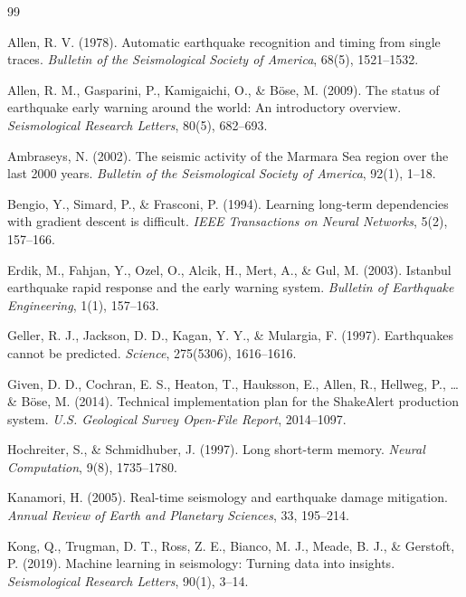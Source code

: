 \begin{thebibliography}{99}

Allen, R. V. (1978). Automatic earthquake recognition and timing from single traces. \textit{Bulletin of the Seismological Society of America}, 68(5), 1521--1532.

Allen, R. M., Gasparini, P., Kamigaichi, O., \& Böse, M. (2009). The status of earthquake early warning around the world: An introductory overview. \textit{Seismological Research Letters}, 80(5), 682--693.

Ambraseys, N. (2002). The seismic activity of the Marmara Sea region over the last 2000 years. \textit{Bulletin of the Seismological Society of America}, 92(1), 1--18.

Bengio, Y., Simard, P., \& Frasconi, P. (1994). Learning long-term dependencies with gradient descent is difficult. \textit{IEEE Transactions on Neural Networks}, 5(2), 157--166.

Erdik, M., Fahjan, Y., Ozel, O., Alcik, H., Mert, A., \& Gul, M. (2003). Istanbul earthquake rapid response and the early warning system. \textit{Bulletin of Earthquake Engineering}, 1(1), 157--163.

Geller, R. J., Jackson, D. D., Kagan, Y. Y., \& Mulargia, F. (1997). Earthquakes cannot be predicted. \textit{Science}, 275(5306), 1616--1616.

Given, D. D., Cochran, E. S., Heaton, T., Hauksson, E., Allen, R., Hellweg, P., \ldots \& Böse, M. (2014). Technical implementation plan for the ShakeAlert production system. \textit{U.S. Geological Survey Open-File Report}, 2014--1097.

Hochreiter, S., \& Schmidhuber, J. (1997). Long short-term memory. \textit{Neural Computation}, 9(8), 1735--1780.

Kanamori, H. (2005). Real-time seismology and earthquake damage mitigation. \textit{Annual Review of Earth and Planetary Sciences}, 33, 195--214.

Kong, Q., Trugman, D. T., Ross, Z. E., Bianco, M. J., Meade, B. J., \& Gerstoft, P. (2019). Machine learning in seismology: Turning data into insights. \textit{Seismological Research Letters}, 90(1), 3--14.


\end{thebibliography}
